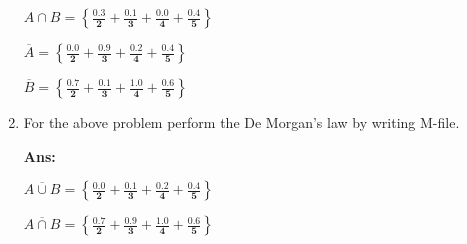 \documentclass{article}
\begin{document}
\begin{enumerate}
        $
          A \cap B \boldsymbol{=
            \left\{
            \frac{0.3}{2} +
            \frac{0.1}{3} +
            \frac{0.0}{4} +
            \frac{0.4}{5}
            \right\}}
        $

        $
          \overline{A}  \boldsymbol{=
            \left\{
            \frac{0.0}{2} +
            \frac{0.9}{3} +
            \frac{0.2}{4} +
            \frac{0.4}{5}
            \right\}}
        $

        $
          \overline{B}  \boldsymbol{=
            \left\{
            \frac{0.7}{2} +
            \frac{0.1}{3} +
            \frac{1.0}{4} +
            \frac{0.6}{5}
            \right\}}
        $

  \item For the above problem perform the De Morgan's law by writing M-file.

        \textbf{Ans:}

        $
          \overline{A \cup B} \boldsymbol{=
            \left\{
            \frac{0.0}{2} +
            \frac{0.1}{3} +
            \frac{0.2}{4} +
            \frac{0.4}{5}
            \right\}}
        $

        $
          \overline{A \cap B} \boldsymbol{=
            \left\{
            \frac{0.7}{2} +
            \frac{0.9}{3} +
            \frac{1.0}{4} +
            \frac{0.6}{5}
            \right\}}
        $

\end{enumerate}
\end{document}
